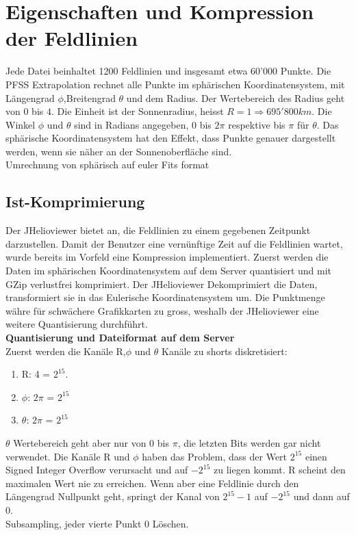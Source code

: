 \section{Eigenschaften und Kompression der Feldlinien}
Jede Datei beinhaltet 1200 Feldlinien und insgesamt etwa 60'000 Punkte. Die PFSS Extrapolation rechnet alle Punkte im sphärischen Koordinatensystem, mit Längengrad $\phi$,Breitengrad $\theta$ und dem Radius. Der Wertebereich des Radius geht von $0$ bis $4$. Die Einheit ist der Sonnenradius, heisst $R = 1 \Rightarrow 695'800 km$. Die Winkel $\phi$ und $\theta$ sind in Radians angegeben, $0$ bis $2\pi$ respektive bis $\pi$ für $\theta$. Das sphärische Koordinatensystem hat den Effekt, dass Punkte genauer dargestellt werden, wenn sie näher an der Sonnenoberfläche sind.\\
[\baselineskip]
Umrechnung von sphärisch auf euler
Fits format \cite{website:fits}

\subsection{Ist-Komprimierung} \label{konzept:ist-komprimierung}
Der JHelioviewer bietet an, die Feldlinien zu einem gegebenen Zeitpunkt darzustellen. Damit der Benutzer eine vernünftige Zeit auf die Feldlinien wartet, wurde bereits im Vorfeld eine Kompression implementiert. Zuerst werden die Daten im sphärischen Koordinatensystem auf dem Server quantisiert und mit GZip verlustfrei komprimiert. Der JHelioviewer Dekomprimiert die Daten, transformiert sie in das Eulerische Koordinatensystem um. Die Punktmenge währe für schwächere Grafikkarten zu gross, weshalb der JHelioviewer eine weitere Quantisierung durchführt.\\
[\baselineskip]
\textbf{Quantisierung und Dateiformat auf dem Server}\\
Zuerst werden die Kanäle R,$\phi$ und $\theta$ Kanäle zu shorts diskretisiert:
\begin{enumerate}
 \item R: 4 = $2^{15}$. 
 \item $\phi$: $2\pi$ = $2^{15}$
 \item $\theta$: $2\pi$ = $2^{15}$
\end{enumerate}
$\theta$ Wertebereich geht aber nur von 0 bis $\pi$, die letzten Bits werden gar nicht verwendet. Die Kanäle R und $\phi$ haben das Problem, dass der Wert $2^{15}$ einen Signed Integer Overflow verursacht und auf $-2^{15}$ zu liegen kommt. R scheint den maximalen Wert nie zu erreichen. Wenn aber eine Feldlinie durch den Längengrad Nullpunkt geht, springt der Kanal von  $2^{15}-1$ auf $-2^{15}$ und dann auf 0.\\
[\baselineskip]
Subsampling, jeder vierte Punkt 
0 Löschen.

